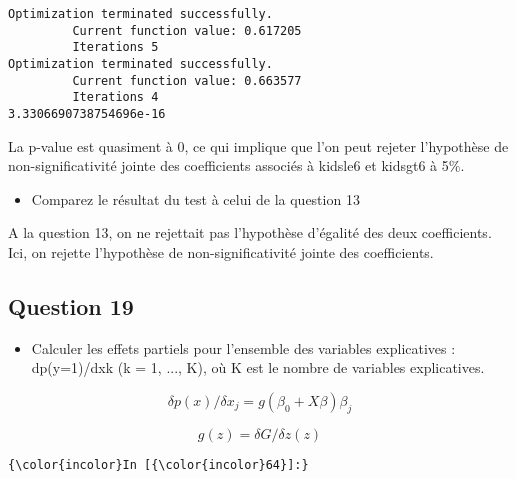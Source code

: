 \documentclass[11pt]{article}
\providecommand{\tightlist}{%
      \setlength{\itemsep}{0pt}\setlength{\parskip}{0pt}}
\begin{document}
    \begin{Verbatim}[commandchars=\\\{\}]
Optimization terminated successfully.
         Current function value: 0.617205
         Iterations 5
Optimization terminated successfully.
         Current function value: 0.663577
         Iterations 4
3.3306690738754696e-16

    \end{Verbatim}

    La p-value est quasiment à 0, ce qui implique que l'on peut rejeter
l'hypothèse de non-significativité jointe des coefficients associés à
kidsle6 et kidsgt6 à 5\%.

    \begin{itemize}
\tightlist
\item
  Comparez le résultat du test à celui de la question 13 
\end{itemize}

    A la question 13, on ne rejettait pas l'hypothèse d'égalité des deux
coefficients. Ici, on rejette l'hypothèse de non-significativité jointe
des coefficients.

    \subsection{Question 19}\label{question-19}

\begin{itemize}
\tightlist
\item
  Calculer les effets partiels pour l'ensemble des variables
  explicatives : dp(y=1)/dxk (k = 1, ..., K), où K est le nombre de
  variables explicatives. 
\end{itemize}

    \[ \delta p(x) / \delta x_j = g(\beta_0 + X \beta) \beta_j \]

\[ g(z) = \delta G / \delta z (z) \]

    \begin{Verbatim}[commandchars=\\\{\}]
{\color{incolor}In [{\color{incolor}64}]:} 
\end{Verbatim}
\end{document}

